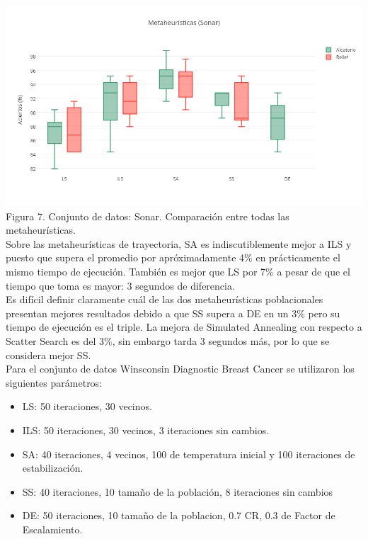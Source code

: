 \documentclass{ci5652}
\begin{document}
\includegraphics[width=\columnwidth]{metaheuristicas_Sonar}
{\small Figura 7. Conjunto de datos: Sonar. Comparación entre todas las
metaheurísticas.}\\

Sobre las metaheurísticas de trayectoria, SA es indiscutiblemente mejor a ILS y
puesto que supera el promedio por apróximadamente 4\% en prácticamente el mismo
tiempo de ejecución. También es mejor que LS por 7\% a pesar de que el tiempo
que toma es mayor: 3 segundos de diferencia.\\

Es difícil definir claramente cuál de las dos metaheurísticas poblacionales
presentan mejores resultados debido a que SS supera a DE en un 3\% pero su
tiempo de ejecución es el triple. La mejora de Simulated Annealing con respecto
a Scatter Search es del 3\%, sin embargo tarda 3 segundos más, por lo que se
considera mejor SS.\\

Para el conjunto de datos Winsconsin Diagnostic Breast Cancer se utilizaron los siguientes parámetros:
\begin{itemize}
  \item LS: 50 iteraciones, 30 vecinos.
  \item ILS: 50 iteraciones, 30 vecinos, 3 iteraciones sin cambios.
  \item SA: 40 iteraciones, 4 vecinos, 100 de temperatura inicial y 100
  iteraciones de estabilización.
  \item SS: 40 iteraciones, 10 tamaño de la población, 8 iteraciones sin cambios
  \item DE: 50 iteraciones, 10 tamaño de la poblacion, 0.7 CR, 0.3 de Factor de
  Escalamiento.
\end{itemize}
\end{document}

